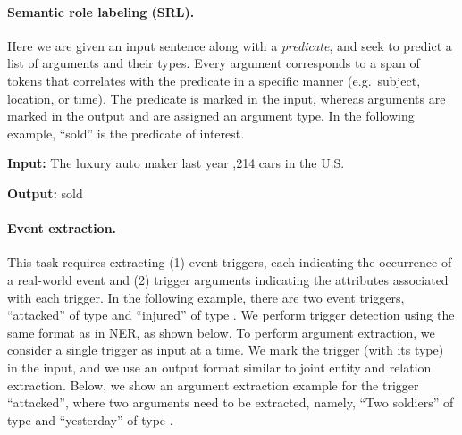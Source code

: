 \paragraph{Semantic role labeling (SRL).}
Here we are given an input sentence along with a \emph{predicate}, and seek to predict a list of arguments and their types. %
Every argument corresponds to a span of tokens that correlates with the predicate in a specific manner (e.g.\ subject, location, or time).
The predicate is marked in the input, whereas arguments are marked in the output and are assigned an argument type.
In the following example, ``sold'' is the predicate of interest.

\begin{footnotesize}
\begin{customquote}
\quotespacestart
    \textbf{Input:}
    \nohyphens{The luxury auto maker last year \entitybegin {} ,214 cars in the U.S.}
    
    \textbf{Output:}
    \entitybegin {} \separator {} \entityend \entitybegin {} \separator {} \entityend 
    sold
     \entitybegin {} \separator {} \entityend \entitybegin {} \separator {} \entityend
\quotespaceend
\end{customquote}
\end{footnotesize}

\paragraph{Event extraction.}
This task requires extracting
(1) event triggers, each indicating the occurrence of a real-world event
and (2) trigger arguments indicating the attributes associated with each trigger.
In the following example, there are two event triggers, ``attacked'' of type  and ``injured'' of type . We perform trigger detection using the same format as in NER, as shown below. 
To perform argument extraction, we consider a single trigger as input at a time.
We mark the trigger (with its type) in the input, and we use an output format similar to joint entity and relation extraction.
Below, we show an argument extraction example for the trigger ``attacked'', where two arguments need to be extracted, namely, ``Two soldiers'' of type  and ``yesterday'' of type .

